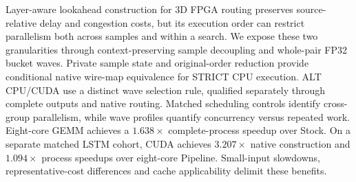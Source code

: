 Layer-aware lookahead construction for 3D FPGA routing preserves source-relative delay and congestion costs, but its execution order can restrict parallelism both across samples and within a search. We expose these two granularities through context-preserving sample decoupling and whole-pair FP32 bucket waves. Private sample state and original-order reduction provide conditional native wire-map equivalence for STRICT CPU execution. ALT CPU/CUDA use a distinct wave selection rule, qualified separately through complete outputs and native routing. Matched scheduling controls identify cross-group parallelism, while wave profiles quantify concurrency versus repeated work. Eight-core GEMM achieves a $1.638\times$ complete-process speedup over Stock. On a separate matched LSTM cohort, CUDA achieves $3.207\times$ native construction and $1.094\times$ process speedups over eight-core Pipeline. Small-input slowdowns, representative-cost differences and cache applicability delimit these benefits.
